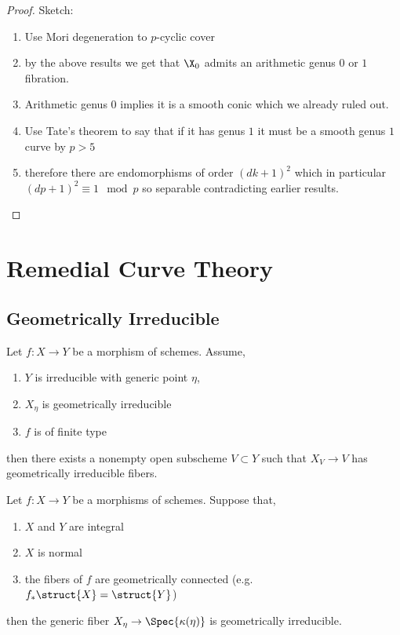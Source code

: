 \documentclass[12pt]{article}
\begin{document}
\begin{proof}
Sketch:
\begin{enumerate}
\item Use Mori degeneration to $p$-cyclic cover
\item by the above results we get that $\X_0$ admits an arithmetic genus $0$ or $1$ fibration. 

\item Arithmetic genus $0$ implies it is a smooth conic which we already ruled out. 

\item Use Tate's theorem to say that if it has genus $1$ it must be a smooth genus $1$ curve by $p > 5$

\item therefore there are endomorphisms of order $(dk + 1)^2$ which in particular $(dp + 1)^2 \equiv 1 \mod p$ so separable contradicting earlier results. 
\end{enumerate}
\end{proof}

\section{Remedial Curve Theory}


\subsection{Geometrically Irreducible}

\begin{lemma} 
Let $f : X \to Y$ be a morphism of schemes. Assume,
\begin{enumerate}
\item $Y$ is irreducible with generic point $\eta$,
\item $X_\eta$ is geometrically irreducible
\item $f$ is of finite type
\end{enumerate}
then there exists a nonempty open subscheme $V \subset Y$ such that $X_V \to V$ has geometrically irreducible fibers.
\end{lemma}

\begin{lemma}
Let $f : X \to Y$ be a morphisms of schemes. Suppose that,
\begin{enumerate}
\item $X$ and $Y$ are integral
\item $X$ is normal
\item the fibers of $f$ are geometrically connected (e.g. $f_* \struct{X} = \struct{Y}$)
\end{enumerate} 
then the generic fiber $X_{\eta} \to \Spec{\kappa(\eta)}$ is geometrically irreducible.
\end{lemma}
\end{document}
